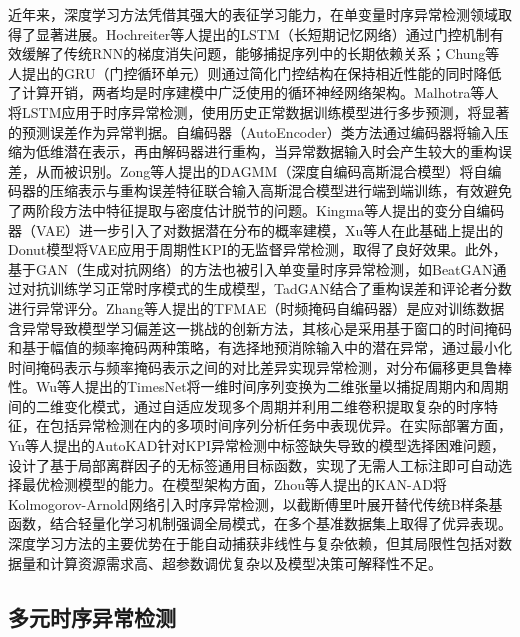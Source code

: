 近年来，深度学习方法凭借其强大的表征学习能力，在单变量时序异常检测领域取得了显著进展\cite{choi2021deepreview,pang2021deepsurvey,chalapathy2019deeplearning}。Hochreiter等人\cite{hochreiter1997lstm}提出的LSTM（长短期记忆网络）通过门控机制有效缓解了传统RNN的梯度消失问题，能够捕捉序列中的长期依赖关系；Chung等人\cite{chung2014gru}提出的GRU（门控循环单元）则通过简化门控结构在保持相近性能的同时降低了计算开销，两者均是时序建模中广泛使用的循环神经网络架构。Malhotra等人\cite{malhotra2015lstm}将LSTM应用于时序异常检测，使用历史正常数据训练模型进行多步预测，将显著的预测误差作为异常判据。自编码器（AutoEncoder）类方法通过编码器将输入压缩为低维潜在表示，再由解码器进行重构，当异常数据输入时会产生较大的重构误差，从而被识别。Zong等人\cite{zong2018dagmm}提出的DAGMM（深度自编码高斯混合模型）将自编码器的压缩表示与重构误差特征联合输入高斯混合模型进行端到端训练，有效避免了两阶段方法中特征提取与密度估计脱节的问题。Kingma等人\cite{kingma2014vae}提出的变分自编码器（VAE）进一步引入了对数据潜在分布的概率建模，Xu等人\cite{xu2018donut}在此基础上提出的Donut模型将VAE应用于周期性KPI的无监督异常检测，取得了良好效果。此外，基于GAN（生成对抗网络）的方法也被引入单变量时序异常检测，如BeatGAN\cite{zhou2019beatgan}通过对抗训练学习正常时序模式的生成模型，TadGAN\cite{geiger2020tadgan}结合了重构误差和评论者分数进行异常评分。Zhang等人\cite{zhang2024tfmae}提出的TFMAE（时频掩码自编码器）是应对训练数据含异常导致模型学习偏差这一挑战的创新方法，其核心是采用基于窗口的时间掩码和基于幅值的频率掩码两种策略，有选择地预消除输入中的潜在异常，通过最小化时间掩码表示与频率掩码表示之间的对比差异实现异常检测，对分布偏移更具鲁棒性。Wu等人\cite{wu2023timesnet}提出的TimesNet将一维时间序列变换为二维张量以捕捉周期内和周期间的二维变化模式，通过自适应发现多个周期并利用二维卷积提取复杂的时序特征，在包括异常检测在内的多项时间序列分析任务中表现优异。在实际部署方面，Yu等人\cite{yu2023autokad}提出的AutoKAD针对KPI异常检测中标签缺失导致的模型选择困难问题，设计了基于局部离群因子的无标签通用目标函数，实现了无需人工标注即可自动选择最优检测模型的能力。在模型架构方面，Zhou等人\cite{zhou2025kanad}提出的KAN-AD将Kolmogorov-Arnold网络引入时序异常检测，以截断傅里叶展开替代传统B样条基函数，结合轻量化学习机制强调全局模式，在多个基准数据集上取得了优异表现。深度学习方法的主要优势在于能自动捕获非线性与复杂依赖，但其局限性包括对数据量和计算资源需求高、超参数调优复杂以及模型决策可解释性不足\cite{chen2025tsadsurvey}。

\subsection{多元时序异常检测}

